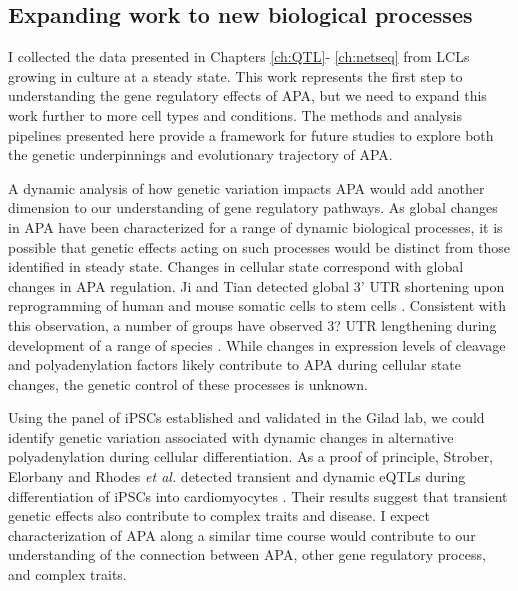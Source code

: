 \subsection{Expanding work to new biological processes}

I collected the data presented in Chapters \ref{ch:QTL}- \ref{ch:netseq} from LCLs growing in culture at a steady state. This work represents the first step to understanding the gene regulatory effects of APA, but we need to expand this work further to more cell types and conditions. The methods and analysis pipelines presented here provide a framework for future studies to explore both the genetic underpinnings and evolutionary trajectory of APA. 

A dynamic analysis of how genetic variation impacts APA would add another dimension to our understanding of gene regulatory pathways. As global changes in APA have been characterized for a range of dynamic biological processes, it is possible that genetic effects acting on such processes would be distinct from those identified in steady state. Changes in cellular state correspond with global changes in APA regulation. Ji and Tian detected global 3' UTR shortening upon reprogramming of human and mouse somatic cells to stem cells \citep{ji_progressive_2009}. Consistent with this observation, a number of groups have observed 3? UTR lengthening during development of a range of species \citep{ji_progressive_2009, hilgers_neural-specific_2011, li_dynamic_2012, mueller_alls_2013}. While changes in expression levels of cleavage and polyadenylation factors likely contribute to APA during cellular state changes, the genetic control of these processes is unknown. 

Using the panel of iPSCs established and validated in the Gilad lab, we could identify genetic variation associated with dynamic changes in alternative polyadenylation during cellular differentiation. As a proof of principle, Strober, Elorbany and Rhodes \emph{et al.} detected transient and dynamic eQTLs during differentiation of iPSCs into cardiomyocytes \citep{strober_dynamic_2019}. Their results suggest that transient genetic effects also contribute to complex traits and disease. I expect characterization of APA along a similar time course would contribute to our understanding of the connection between APA, other gene regulatory process, and complex traits.

